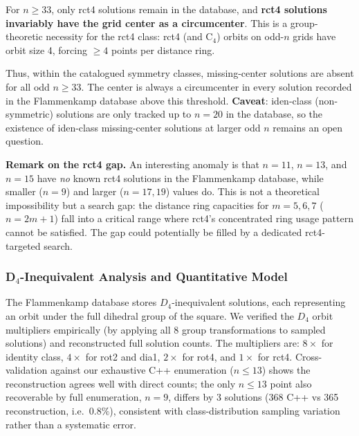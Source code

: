 \documentclass[11pt,a4paper]{article}
\theoremstyle{plain}
\theoremstyle{definition}
\begin{document}
For $n\ge 33$, only rct4 solutions remain in the database, and \textbf{rct4 solutions invariably have the grid center as a circumcenter}. This is a group-theoretic necessity for the rct4 class: rct4 (and C$_4$) orbits on odd-$n$ grids have orbit size 4, forcing $\ge 4$ points per distance ring.

Thus, within the catalogued symmetry classes, missing-center solutions are absent for all odd $n\ge 33$. The center is always a circumcenter in every solution recorded in the Flammenkamp database above this threshold. \textbf{Caveat}: iden-class (non-symmetric) solutions are only tracked up to $n=20$ in the database, so the existence of iden-class missing-center solutions at larger odd $n$ remains an open question.

\noindent\textbf{Remark on the rct4 gap.} An interesting anomaly is that $n=11$, $n=13$, and $n=15$ have \emph{no} known rct4 solutions in the Flammenkamp database, while smaller ($n=9$) and larger ($n=17,19$) values do. This is not a theoretical impossibility but a search gap: the distance ring capacities for $m=5,6,7$ ($n=2m+1$) fall into a critical range where rct4's concentrated ring usage pattern cannot be satisfied. The gap could potentially be filled by a dedicated rct4-targeted search.

\subsubsection{D$_4$-Inequivalent Analysis and Quantitative Model}
\label{sec:regression}

The Flammenkamp database stores $D_4$-inequivalent solutions, each representing an orbit under the full dihedral group of the square. We verified the $D_4$ orbit multipliers empirically (by applying all 8 group transformations to sampled solutions) and reconstructed full solution counts. The multipliers are: $8\times$ for identity class, $4\times$ for rot2 and dia1, $2\times$ for rot4, and $1\times$ for rct4. Cross-validation against our exhaustive C++ enumeration ($n\le13$) shows the reconstruction agrees well with direct counts; the only $n\le13$ point also recoverable by full enumeration, $n=9$, differs by 3 solutions (368 C++ vs 365 reconstruction, i.e.\ $0.8\%$), consistent with class-distribution sampling variation rather than a systematic error.
\end{document}
